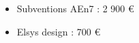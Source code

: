 \begin{frame}
   \begin{itemize}
      \item Subventions AEn7 : 2 900 €
      \item Elsys design : 700 €
   \end{itemize}
\end{frame}
